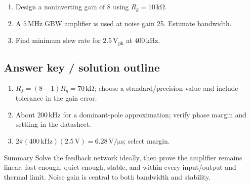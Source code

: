 \documentclass[10pt,letterpaper]{article}
\begin{document}
\begin{enumerate}
  \item Design a noninverting gain of 8 using $R_g=10\,\mathrm{k\Omega}$.
  \item A $5\,\mathrm{MHz}$ GBW amplifier is used at noise gain 25. Estimate bandwidth.
  \item Find minimum slew rate for $2.5\,\mathrm{V_{pk}}$ at $400\,\mathrm{kHz}$.
\end{enumerate}\subsection{Answer key / solution outline}
\begin{enumerate}
  \item $R_f=(8-1)R_g=70\,\mathrm{k\Omega}$; choose a standard/precision value and include tolerance in the gain error.
  \item About $200\,\mathrm{kHz}$ for a dominant-pole approximation; verify phase margin and settling in the datasheet.
  \item $2\pi(400\,\mathrm{kHz})(2.5\,\mathrm{V})=6.28\,\mathrm{V/\mu s}$; select margin.
\end{enumerate}\begin{CornellSummaryBox}{Summary}
Solve the feedback network ideally, then prove the amplifier remains linear, fast enough, quiet enough, stable, and within every input/output and thermal limit. Noise gain is central to both bandwidth and stability.
\end{CornellSummaryBox}
\end{document}
